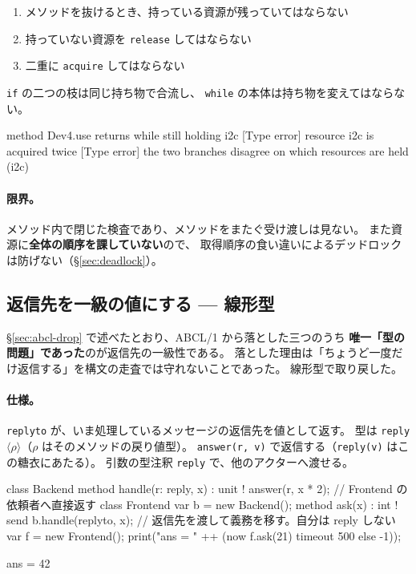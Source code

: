 \documentclass[11pt,a4paper]{ltjsarticle}
\theoremstyle{definition}
\theoremstyle{remark}
\begin{document}
\begin{enumerate}
\item メソッドを抜けるとき、持っている資源が残っていてはならない
\item 持っていない資源を \texttt{release} してはならない
\item 二重に \texttt{acquire} してはならない
\end{enumerate}

\texttt{if} の二つの枝は同じ持ち物で合流し、
\texttt{while} の本体は持ち物を変えてはならない。

\begin{term}
 method Dev4.use returns while still holding i2c
[Type error] resource i2c is acquired twice
[Type error] the two branches disagree on which resources are held (i2c)
\end{term}

\paragraph{限界。}
メソッド内で閉じた検査であり、メソッドをまたぐ受け渡しは見ない。
また資源に\textbf{全体の順序を課していない}ので、
取得順序の食い違いによるデッドロックは防げない（\S\ref{sec:deadlock}）。

\subsection{返信先を一級の値にする --- 線形型}
\label{sec:reply1st}

\S\ref{sec:abcl-drop} で述べたとおり、ABCL/1 から落とした三つのうち
\textbf{唯一「型の問題」であった}のが返信先の一級性である。
落とした理由は「ちょうど一度だけ返信する」を構文の走査では守れないことであった。
線形型で取り戻した。

\paragraph{仕様。}
\texttt{replyto} が、いま処理しているメッセージの返信先を値として返す。
型は \texttt{reply}$\langle\rho\rangle$（$\rho$ はそのメソッドの戻り値型）。
\texttt{answer(r, v)} で返信する（\texttt{reply(v)} はこの糖衣にあたる）。
引数の型注釈 \texttt{reply} で、他のアクターへ渡せる。

\begin{aipl}
class Backend {
  method handle(r: reply, x) : unit !{} {
    answer(r, x * 2);            // Frontend の依頼者へ直接返す
  }
}
class Frontend {
  var b = new Backend();
  method ask(x) : int !{} {
    send b.handle(replyto, x);   // 返信先を渡して義務を移す。自分は reply しない
  }
}
var f = new Frontend();
print("ans = " ++ (now f.ask(21) timeout 500 else -1));
\end{aipl}
\begin{term}
ans = 42
\end{term}
\end{document}
